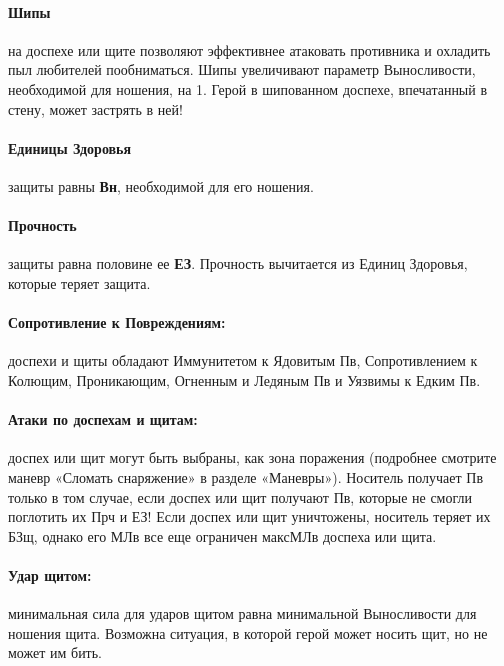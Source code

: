 \paragraph{Шипы} на доспехе или щите позволяют эффективнее атаковать противника и охладить пыл любителей пообниматься. Шипы увеличивают параметр Выносливости, необходимой для ношения, на 1. Герой в шипованном доспехе, впечатанный в стену, может застрять в ней!
\paragraph{Единицы Здоровья} защиты равны \textbf{Вн}, необходимой для его ношения.
\paragraph{Прочность} защиты равна половине ее \textbf{ЕЗ}. Прочность вычитается из Единиц Здоровья, которые теряет защита.
\paragraph{Сопротивление к Повреждениям:} доспехи и щиты обладают Иммунитетом к Ядовитым Пв, Сопротивлением к Колющим, Проникающим, Огненным и Ледяным Пв и Уязвимы к Едким Пв.
\paragraph{Атаки по доспехам и щитам:} доспех или щит могут быть выбраны, как зона поражения (подробнее смотрите маневр «Сломать снаряжение» в разделе «Маневры»). Носитель получает Пв только в том случае, если доспех или щит получают Пв, которые не смогли поглотить их Прч и ЕЗ! Если доспех или щит уничтожены, носитель теряет их БЗщ, однако его МЛв все еще ограничен максМЛв доспеха или щита.
\paragraph{Удар щитом:} минимальная сила для ударов щитом равна минимальной Выносливости для ношения щита. Возможна ситуация, в которой герой может носить щит, но не может им бить.
